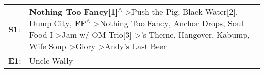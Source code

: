 \begin{supertabular}{p{0.03\textwidth}p{0.92\textwidth}}
 \textbf{S1}:  &  \textbf{Nothing Too Fancy[1]\textsuperscript{$\wedge$}} \textgreater \enspace Push the Pig\textsuperscript{}, \enspace Black Water[2]\textsuperscript{}, \enspace Dump City\textsuperscript{}, \enspace \textbf{FF\textsuperscript{$\wedge$}} \textgreater \enspace Nothing Too Fancy\textsuperscript{}, \enspace Anchor Drops\textsuperscript{}, \enspace Soul Food I\textsuperscript{} \textgreater \enspace Jam w/ OM Trio[3]\textsuperscript{} \textgreater {}'s Theme\textsuperscript{}, \enspace Hangover\textsuperscript{}, \enspace Kabump\textsuperscript{}, \enspace Wife Soup\textsuperscript{} \textgreater \enspace Glory\textsuperscript{} \textgreater \enspace Andy's Last Beer\textsuperscript{}  \enspace  \\
 \textbf{E1}:  &                                                                                                                                                                                                                                                                                                                                                                                                                                                                                                                                                                                                                                                                                               Uncle Wally\textsuperscript{}  \enspace  \\
\end{supertabular}
